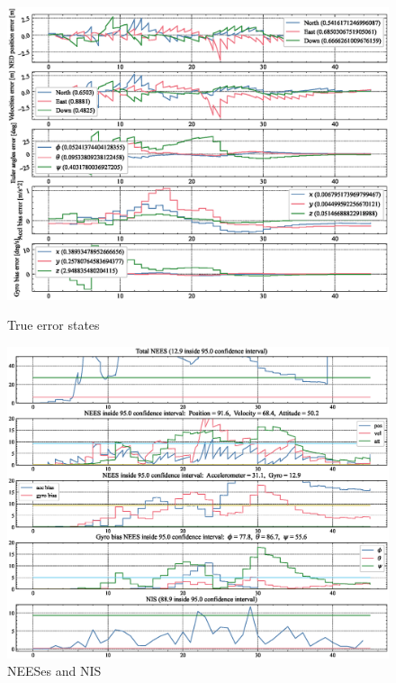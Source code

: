 \begin{figure}
    \centering
    \includegraphics[clip, trim= 0cm 0cm 0cm 0cm, width = \textwidth]{figures/sim_3.eps}
    \caption{True error states}
	\label{fig:23states}
	\includegraphics[clip, trim= 0cm 0cm 0cm 0cm, width = \textwidth]{figures/sim_10.eps}
    \caption{NEESes and NIS}
    \label{fig:23states}
\end{figure}